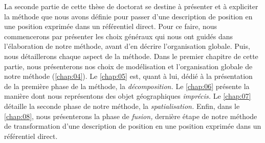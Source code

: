 La seconde partie de cette thèse de doctorat se destine à présenter et
à expliciter la méthode que nous avons définie pour passer d'une
description de position en une position exprimée dans un référentiel
direct. Pour ce faire, nous commencerons par présenter les choix
généraux qui nous ont guidés dans l'élaboration de notre méthode,
avant d'en décrire l'organisation globale. Puis, nous détaillerons
chaque aspect de la méthode. Dans le premier chapitre de cette partie,
nous présenterons nos choix de modélisation et l'organisation globale
de notre méthode (\autoref{chap:04}). Le \autoref{chap:05} est, quant
à lui, dédié à la présentation de la première phase de la méthode, la
\emph{décomposition.} Le \autoref{chap:06} présente la manière dont
nous représentons des objet géographiques \emph{imprécis.} Le
\autoref{chap:07} détaille la seconde phase de notre méthode, la
\emph{spatialisation.} Enfin, dans le \autoref{chap:08}, nous
présenterons la phase de \emph{fusion,} dernière étape de notre
méthode de transformation d'une description de position en une
position exprimée dans un référentiel direct.
